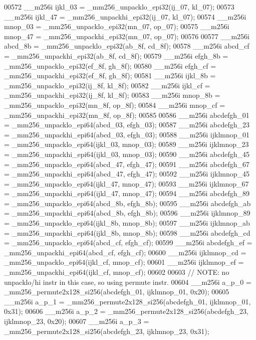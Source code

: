 \begin{DoxyCode}
00572   \_\_m256i ijkl\_03 = \_mm256\_unpacklo\_epi32(ij\_07, kl\_07);
00573   \_\_m256i ijkl\_47 = \_mm256\_unpackhi\_epi32(ij\_07, kl\_07);
00574   \_\_m256i mnop\_03 = \_mm256\_unpacklo\_epi32(mn\_07, op\_07);
00575   \_\_m256i mnop\_47 = \_mm256\_unpackhi\_epi32(mn\_07, op\_07);
00576 
00577   \_\_m256i abcd\_8b = \_mm256\_unpacklo\_epi32(ab\_8f, cd\_8f);
00578   \_\_m256i abcd\_cf = \_mm256\_unpackhi\_epi32(ab\_8f, cd\_8f);
00579   \_\_m256i efgh\_8b = \_mm256\_unpacklo\_epi32(ef\_8f, gh\_8f);
00580   \_\_m256i efgh\_cf = \_mm256\_unpackhi\_epi32(ef\_8f, gh\_8f);
00581   \_\_m256i ijkl\_8b = \_mm256\_unpacklo\_epi32(ij\_8f, kl\_8f);
00582   \_\_m256i ijkl\_cf = \_mm256\_unpackhi\_epi32(ij\_8f, kl\_8f);
00583   \_\_m256i mnop\_8b = \_mm256\_unpacklo\_epi32(mn\_8f, op\_8f);
00584   \_\_m256i mnop\_cf = \_mm256\_unpackhi\_epi32(mn\_8f, op\_8f);
00585 
00586   \_\_m256i abcdefgh\_01 = \_mm256\_unpacklo\_epi64(abcd\_03, efgh\_03);
00587   \_\_m256i abcdefgh\_23 = \_mm256\_unpackhi\_epi64(abcd\_03, efgh\_03);
00588   \_\_m256i ijklmnop\_01 = \_mm256\_unpacklo\_epi64(ijkl\_03, mnop\_03);
00589   \_\_m256i ijklmnop\_23 = \_mm256\_unpackhi\_epi64(ijkl\_03, mnop\_03);
00590   \_\_m256i abcdefgh\_45 = \_mm256\_unpacklo\_epi64(abcd\_47, efgh\_47);
00591   \_\_m256i abcdefgh\_67 = \_mm256\_unpackhi\_epi64(abcd\_47, efgh\_47);
00592   \_\_m256i ijklmnop\_45 = \_mm256\_unpacklo\_epi64(ijkl\_47, mnop\_47);
00593   \_\_m256i ijklmnop\_67 = \_mm256\_unpackhi\_epi64(ijkl\_47, mnop\_47);
00594   \_\_m256i abcdefgh\_89 = \_mm256\_unpacklo\_epi64(abcd\_8b, efgh\_8b);
00595   \_\_m256i abcdefgh\_ab = \_mm256\_unpackhi\_epi64(abcd\_8b, efgh\_8b);
00596   \_\_m256i ijklmnop\_89 = \_mm256\_unpacklo\_epi64(ijkl\_8b, mnop\_8b);
00597   \_\_m256i ijklmnop\_ab = \_mm256\_unpackhi\_epi64(ijkl\_8b, mnop\_8b);
00598   \_\_m256i abcdefgh\_cd = \_mm256\_unpacklo\_epi64(abcd\_cf, efgh\_cf);
00599   \_\_m256i abcdefgh\_ef = \_mm256\_unpackhi\_epi64(abcd\_cf, efgh\_cf);
00600   \_\_m256i ijklmnop\_cd = \_mm256\_unpacklo\_epi64(ijkl\_cf, mnop\_cf);
00601   \_\_m256i ijklmnop\_ef = \_mm256\_unpackhi\_epi64(ijkl\_cf, mnop\_cf);
00602 
00603   \textcolor{comment}{// NOTE: no unpacklo/hi instr in this case, so using permute instr.}
00604   \_\_m256i a\_p\_0 = \_mm256\_permute2x128\_si256(abcdefgh\_01, ijklmnop\_01, 0x20);
00605   \_\_m256i a\_p\_1 = \_mm256\_permute2x128\_si256(abcdefgh\_01, ijklmnop\_01, 0x31);
00606   \_\_m256i a\_p\_2 = \_mm256\_permute2x128\_si256(abcdefgh\_23, ijklmnop\_23, 0x20);
00607   \_\_m256i a\_p\_3 = \_mm256\_permute2x128\_si256(abcdefgh\_23, ijklmnop\_23, 0x31);

\end{DoxyCode}
